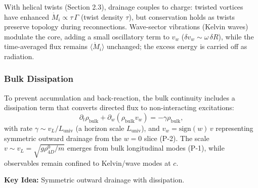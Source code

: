 With helical twists (Section 2.3), drainage couples to charge: twisted vortices have enhanced $\dot M_i \propto \tau\,\Gamma$ (twist density $\tau$), but conservation holds as twists preserve topology during reconnections. Wave-sector vibrations (Kelvin waves) modulate the core, adding a small oscillatory term to $v_w$ ($\delta v_w \sim \omega\,\delta R$), while the time-averaged flux remains $\langle \dot M_i \rangle$ unchanged; the excess energy is carried off as radiation.

\subsubsection{Bulk Dissipation}
To prevent accumulation and back-reaction, the bulk continuity includes a dissipation term that converts directed flux to non-interacting excitations:
\begin{equation}
\partial_t \rho_{\text{bulk}} + \partial_w (\rho_{\text{bulk}} v_w) = -\gamma \rho_{\text{bulk}},
\end{equation}
with rate $\gamma \sim v_L/L_{\text{univ}}$ (a horizon scale $L_{\text{univ}}$), and $v_w=\mathrm{sign}(w)\,v$ representing symmetric outward drainage from the $w=0$ slice (P-2). The scale $v \sim v_L=\sqrt{g\rho_{4D}^0/m}$ emerges from bulk longitudinal modes (P-1), while observables remain confined to Kelvin/wave modes at $c$.

\textbf{Key Idea:} Symmetric outward drainage with dissipation.

